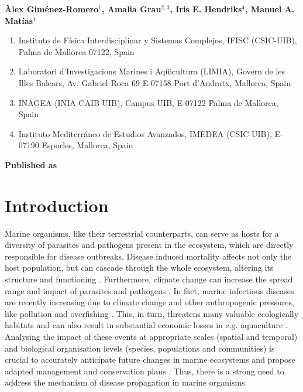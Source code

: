 \vspace{3cm}

\begin{center}
    \textbf{Àlex Giménez-Romero$^{1}$, Amalia Grau$^{2,3}$, Iris E.
        Hendriks$^{4}$, Manuel A. Matías$^{1}$}
\end{center}

\vspace{1cm}

\begin{enumerate}
    \small
    \item Instituto de Física Interdisciplinar y Sistemas Complejos, IFISC
          (CSIC-UIB), Palma de Mallorca 07122, Spain
    \item Laboratori d’Investigacions Marines i Aqüicultura (LIMIA), Govern de
          les Illes Balears, Av. Gabriel Roca 69 E-07158 Port d’Andratx,
          Mallorca, Spain
    \item INAGEA (INIA-CAIB-UIB), Campus UIB, E-07122 Palma de Mallorca, Spain
    \item Instituto Mediterráneo de Estudios Avanzados, IMEDEA (CSIC-UIB),
          E-07190 Esporles, Mallorca, Spain
\end{enumerate}

\vspace{1cm}

\textbf{Published as}

\vspace{0.5cm}


\newpage
\section{Introduction}\label{sec:Introduction_Nacras_I}

Marine organisms, like their terrestrial counterparts, can serve as hosts
for a diversity of parasites and pathogens present in the ecosystem, which are
directly responsible for disease outbreaks. Disease induced mortality affects
not only the host population, but can cascade through the whole ecosystem,
altering its structure and functioning \cite{Ward2004}. Furthermore, climate
change can increase the spread range and impact of parasites and pathogens
\cite{Burge2014}. In fact, marine infectious diseases are recently increasing
due to climate change and other anthropogenic pressures, like pollution and
overfishing \cite{Lafferty2004}. This, in turn, threatens many valuable
ecologically habitats and can also result in substantial economic losses in
e.g. aquaculture \cite{Lafferty2015}. Analysing the impact of these events at
appropriate scales (spatial and temporal) and biological organisation levels
(species, populations and communities) is crucial to accurately anticipate
future changes in marine ecosystems and propose adapted management and
conservation plans \cite{Pairaud2014}. Thus, there is a strong need to address
the mechanism of disease propagation in marine organisms.

